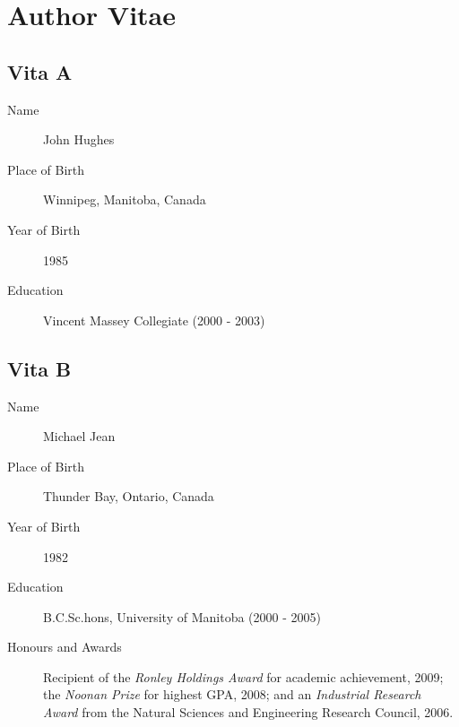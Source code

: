 \chapter{Author Vitae}

\section*{Vita A}
\begin{description}
\item[Name] John Hughes
\item[Place of Birth] Winnipeg, Manitoba, Canada
\item[Year of Birth] 1985
\item[Education] Vincent Massey Collegiate (2000 - 2003)
\end{description}

\vspace{0.2in} \titlerule

\section*{Vita B}
\begin{description}
\item[Name] Michael Jean
\item[Place of Birth] Thunder Bay, Ontario, Canada
\item[Year of Birth] 1982
\item[Education] B.C.Sc.hons, University of Manitoba (2000 - 2005)
\item[Honours and Awards] Recipient of the \emph{Ronley Holdings Award} for academic achievement, 2009; the \emph{Noonan Prize} for highest GPA, 2008; and an \emph{Industrial Research Award} from the Natural Sciences and Engineering Research Council, 2006.

\end{description}